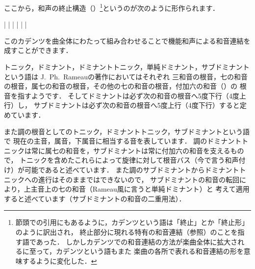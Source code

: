 \documentclass[dvipdfmx,uplatex,b5paper,openany,jbase=12Q,nomag*,textwidth-limit=44%
               ]{gachimuchi}[2020/05/05]
\begin{document}
ここから，和声の終止構造（）\footnote{%
  節頭での引用にもあるように，カデンツという語は「終止」とか「終止形」のように訳出され，
  終止部分に現れる特有の和音連結（参照）のことを指す語であった．
  しかしカデンツでの和音連結の方法が楽曲全体に拡大されるに至って，カデンツという語もまた
  楽曲の各所で表れる和音連結の形を意味するように変化した．
}というのが次のように形作られます．

\begin{Music}
  \Startpiece
  \znotes|\en
  \NOTes%
  |%
  \en\doublebar%
  \znotes|\en
  \NOTes%
  |%
  \en\doublebar%
  \znotes|\en
  \NOTes%
  |%
  \en\setdoublebar%
  \endpiece
\end{Music}

このカデンツを曲全体にわたって組み合わせることで機能和声による和音連結を成すことができます．


\begin{Yodan}
トニック，ドミナント，ドミナントトニック，単純ドミナント，サブドミナントという語は
J.~Ph.~Rameauの著作においてはそれぞれ
三和音の根音，七の和音の根音，属七の和音の根音，その他の七の和音の根音，付加六の和音（）の
根音を指すようです．
そしてドミナントは必ず次の和音の根音へ5度下行（4度上行）し，
サブドミナントは必ず次の和音の根音へ5度上行（4度下行）すると定めています．

また調の根音としてのトニック，ドミナントトニック，サブドミナントという語で
現在の主音，属音，下属音に相当する音を表しています．
調のドミナントトニックは常に属七の和音を，サブドミナントは常に付加六の和音を支えるもので，
トニックを含めたこれらによって旋律に対して根音バス（今で言う和声付け）が可能であると述べています．
また調のサブドミナントからドミナントトニックへの進行はそのままではできないので，
サブドミナントの和音の転回により，上主音上の七の和音（Rameau風に言うと単純ドミナント）と
考えて適用すると述べています（サブドミナントの和音の二重用法）．
\end{Yodan}
\end{document}
